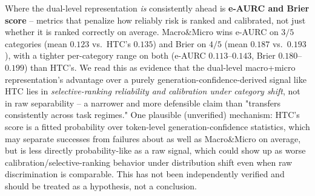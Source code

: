 Where the dual-level representation \emph{is} consistently ahead is
\textbf{e-AURC and Brier score} -- metrics that penalize how reliably risk
is ranked and calibrated, not just whether it is ranked correctly on
average. Macro\&Micro wins e-AURC on \(3/5\) categories (mean \(0.123\)
vs.\ HTC's \(0.135\)) and Brier on \(4/5\) (mean \(0.187\) vs.\ \(0.193\)),
with a tighter per-category range on both (e-AURC \(0.113\)--\(0.143\),
Brier \(0.180\)--\(0.199\)) than HTC's. We read this as evidence that the
dual-level macro+micro representation's advantage over a purely
generation-confidence-derived signal like HTC lies in
\emph{selective-ranking reliability and calibration under category shift},
not in raw separability -- a narrower and more defensible claim than
"transfers consistently across task regimes." One plausible (unverified)
mechanism: HTC's score is a fitted probability over token-level
generation-confidence statistics, which may separate successes from
failures about as well as Macro\&Micro on average, but is less directly
probability-like as a raw signal, which could show up as worse
calibration/selective-ranking behavior under distribution shift even when
raw discrimination is comparable. This has not been independently
verified and should be treated as a hypothesis, not a conclusion.
